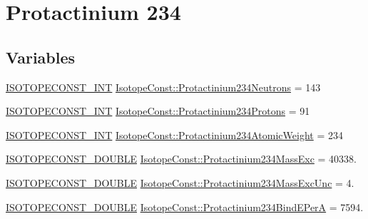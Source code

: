 \hypertarget{group___isotope_const-_protactinium-_pa234}{}\section{Protactinium 234}
\label{group___isotope_const-_protactinium-_pa234}
\subsection*{Variables}
\begin{DoxyCompactItemize}
\item 
\mbox{\hyperlink{group___isotope_const-_macros_ga5f18360b3e99483a35c32d789e62621c}{I\+S\+O\+T\+O\+P\+E\+C\+O\+N\+S\+T\+\_\+\+I\+NT}} \mbox{\hyperlink{group___isotope_const-_protactinium-_pa234_gabb63af99083481ecf1c6d6937fe61ce3}{Isotope\+Const\+::\+Protactinium234\+Neutrons}} = 143
\item 
\mbox{\hyperlink{group___isotope_const-_macros_ga5f18360b3e99483a35c32d789e62621c}{I\+S\+O\+T\+O\+P\+E\+C\+O\+N\+S\+T\+\_\+\+I\+NT}} \mbox{\hyperlink{group___isotope_const-_protactinium-_pa234_gadee9cce1a3227bc69530384da240931d}{Isotope\+Const\+::\+Protactinium234\+Protons}} = 91
\item 
\mbox{\hyperlink{group___isotope_const-_macros_ga5f18360b3e99483a35c32d789e62621c}{I\+S\+O\+T\+O\+P\+E\+C\+O\+N\+S\+T\+\_\+\+I\+NT}} \mbox{\hyperlink{group___isotope_const-_protactinium-_pa234_ga91a80d09700534b1f9e13d9aad986bb1}{Isotope\+Const\+::\+Protactinium234\+Atomic\+Weight}} = 234
\item 
\mbox{\hyperlink{group___isotope_const-_macros_ga8f45a7272ce02c0b4c65c44636ed719a}{I\+S\+O\+T\+O\+P\+E\+C\+O\+N\+S\+T\+\_\+\+D\+O\+U\+B\+LE}} \mbox{\hyperlink{group___isotope_const-_protactinium-_pa234_ga911c6e6843833c15ec16f91eaacf962d}{Isotope\+Const\+::\+Protactinium234\+Mass\+Exc}} = 40338.
\item 
\mbox{\hyperlink{group___isotope_const-_macros_ga8f45a7272ce02c0b4c65c44636ed719a}{I\+S\+O\+T\+O\+P\+E\+C\+O\+N\+S\+T\+\_\+\+D\+O\+U\+B\+LE}} \mbox{\hyperlink{group___isotope_const-_protactinium-_pa234_ga9db7162bce07e4a0cbc018c95d6782c1}{Isotope\+Const\+::\+Protactinium234\+Mass\+Exc\+Unc}} = 4.
\item 
\mbox{\hyperlink{group___isotope_const-_macros_ga8f45a7272ce02c0b4c65c44636ed719a}{I\+S\+O\+T\+O\+P\+E\+C\+O\+N\+S\+T\+\_\+\+D\+O\+U\+B\+LE}} \mbox{\hyperlink{group___isotope_const-_protactinium-_pa234_ga239bc6579e6a541583bd4085097aefde}{Isotope\+Const\+::\+Protactinium234\+Bind\+E\+PerA}} = 7594.

\end{DoxyCompactItemize}
